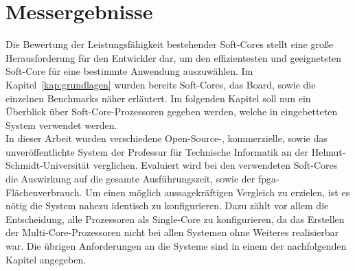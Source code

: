%
%
%
%
%

\chapter{Messergebnisse}\label{kap:ergebnisse}
Die Bewertung der Leistungsfähigkeit bestehender Soft-Cores stellt eine große Herausforderung für den Entwickler dar, um den effizientesten und geeignetsten Soft-Core
für eine bestimmte Anwendung auszuwählen. Im Kapitel~\ref{kap:grundlagen} wurden bereits Soft-Cores, das Board, sowie die einzelnen Benchmarks näher erläutert. Im folgenden Kapitel
soll nun ein Überblick über Soft-Core-Prozessoren gegeben werden, welche in eingebetteten System verwendet werden. \\
In dieser Arbeit wurden verschiedene Open-Source-, kommerzielle, sowie das unveröffentlichte System der Professur für Technische Informatik an der Helmut-Schmidt-Universität verglichen.
 Evaluiert wird bei den verwendeten Soft-Cores
die Auswirkung auf die gesamte Ausführungszeit, sowie der \ac{fpga}-Flächenverbrauch. Um einen möglich aussagekräftigen Vergleich zu erzielen, ist es nötig die System nahezu identisch zu
konfigurieren. Dazu zählt vor allem die Entscheidung, alle Prozessoren als Single-Core zu konfigurieren, da das Erstellen der Multi-Core-Prozessoren nicht bei allen Systemen ohne Weiteres
realisierbar war. Die übrigen Anforderungen an die Systeme sind in einem der nachfolgenden Kapitel angegeben.\\

